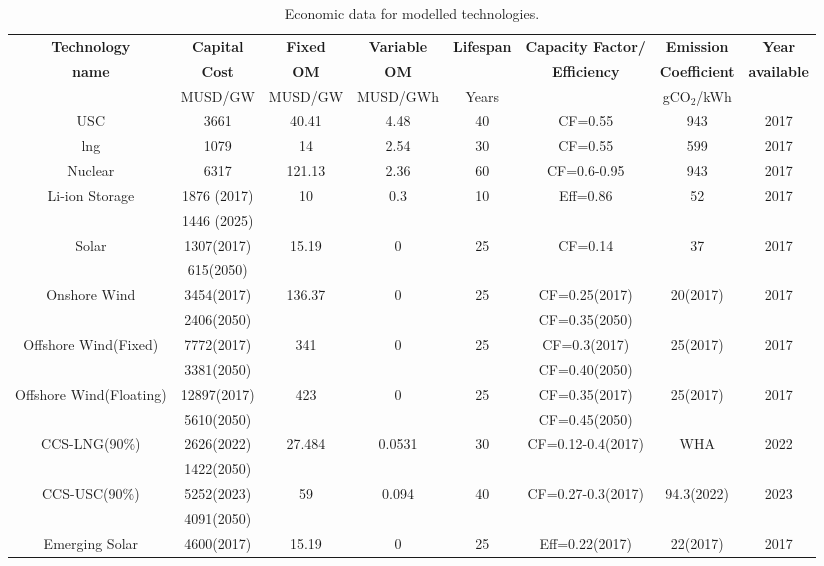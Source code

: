 \begin{landscape}
\begin{longtable}{ |*{8}{c|} }
\caption{Economic data for modelled technologies.}\\
\hline
\textbf{Technology} & \textbf{Capital} & \textbf{Fixed} & \textbf{Variable} & \textbf{Lifespan} & \textbf{Capacity Factor/} & \textbf{Emission} & \textbf{Year} \\
\textbf{name} & \textbf{Cost} & \textbf{\gls{OM}} & \textbf{\gls{OM}} &  & \textbf{Efficiency} & \textbf{Coefficient} & \textbf{available} \\
 & MUSD/GW & MUSD/GW & MUSD/GWh & Years  &  & gCO$_2$/kWh  &  \\
\hline
\endhead  %
\hline
\endfoot  %
\hline
\endlastfoot
\gls{USC} & 3661 & 40.41 & 4.48 & 40 & CF=0.55 & 943 & 2017 \\
\gls{lng} & 1079 & 14 & 2.54 & 30 & CF=0.55 & 599 & 2017 \\
Nuclear & 6317 & 121.13 & 2.36 & 60 & CF=0.6-0.95 & 943 & 2017 \\
Li-ion Storage & 1876 (2017) & 10 & 0.3 & 10 & Eff=0.86 & 52 & 2017 \\
 & 1446 (2025) &  &  &  &  & &  \\
Solar & 1307(2017) & 15.19 & 0  & 25 & CF=0.14 & 37 & 2017 \\
 & 615(2050) & & & & & &  \\
Onshore Wind & 3454(2017) & 136.37 & 0 & 25 & CF=0.25(2017) & 20(2017) & 2017 \\
 & 2406(2050) &  &  &  & CF=0.35(2050) &  &  \\
Offshore Wind(Fixed) & 7772(2017) & 341 & 0 & 25 & CF=0.3(2017) & 25(2017) & 2017 \\
 & 3381(2050) &  &  & & CF=0.40(2050) &  &  \\
Offshore Wind(Floating) & 12897(2017) & 423 & 0 & 25 & CF=0.35(2017) & 25(2017) & 2017 \\
 & 5610(2050) &  &  &  & CF=0.45(2050) &  &  \\
CCS-LNG(90\%) & 2626(2022) & 27.484 & 0.0531 & 30 & CF=0.12-0.4(2017) & WHA & 2022 \\
 & 1422(2050) &  & &  &  &  & \\
CCS-USC(90\%) & 5252(2023) & 59 & 0.094 & 40 & CF=0.27-0.3(2017) & 94.3(2022) & 2023 \\
 & 4091(2050) &  &  &  &  &  & \\
Emerging Solar & 4600(2017) & 15.19 & 0 & 25 & Eff=0.22(2017) & 22(2017) & 2017 \\

\end{longtable}
\end{landscape}
